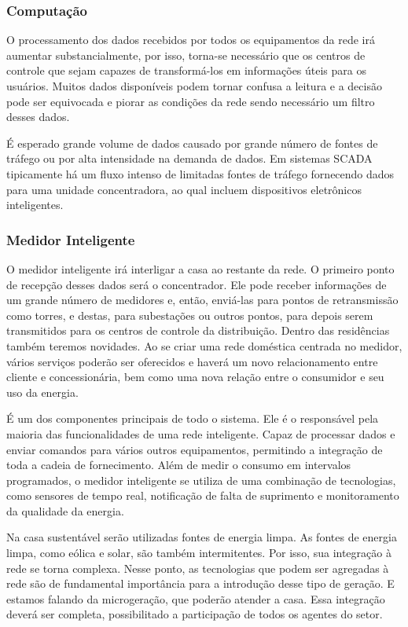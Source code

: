 \subsubsection{Computação}

	O processamento dos dados recebidos por todos os equipamentos da rede irá aumentar substancialmente, por isso, torna-se necessário que os centros de controle que sejam capazes de transformá-los em informações úteis para os usuários. Muitos dados disponíveis podem tornar confusa a leitura e a decisão pode ser equivocada e piorar as condições da rede sendo necessário um filtro desses dados.

	É esperado grande volume de dados causado por grande número de fontes de tráfego ou por alta intensidade na demanda de dados. Em sistemas SCADA tipicamente há um fluxo intenso de limitadas fontes de tráfego fornecendo dados para uma unidade concentradora, ao qual incluem dispositivos eletrônicos inteligentes.

\subsubsection{Medidor Inteligente}

	O medidor inteligente irá interligar a casa ao restante da rede. O primeiro ponto de recepção desses dados será o concentrador. Ele pode receber informações de um grande número de medidores e, então, enviá-las para pontos de retransmissão como torres, e destas, para subestações ou outros pontos, para depois serem transmitidos para os centros de controle da distribuição. Dentro das residências também teremos novidades. Ao se criar uma rede doméstica centrada no medidor, vários serviços poderão ser oferecidos e haverá um novo relacionamento entre cliente e concessionária, bem como uma nova relação entre o consumidor e seu uso da energia.

	É um dos componentes principais de todo o sistema. Ele é o responsável pela maioria das funcionalidades de uma rede inteligente. Capaz de processar dados e enviar comandos para vários outros equipamentos, permitindo a integração de toda a cadeia de fornecimento. Além de medir o consumo em intervalos programados, o medidor inteligente se utiliza de uma combinação de tecnologias, como sensores de tempo real, notificação de falta de suprimento e monitoramento da qualidade da energia.

	Na casa sustentável serão utilizadas fontes de energia limpa. As fontes de energia limpa, como eólica e solar, são também intermitentes. Por isso, sua integração à rede se torna complexa. Nesse ponto, as tecnologias que podem ser agregadas à rede são de fundamental importância para a introdução desse tipo de geração. E estamos falando da microgeração, que poderão atender a casa. Essa integração deverá ser completa, possibilitado a participação de todos os agentes do setor.

